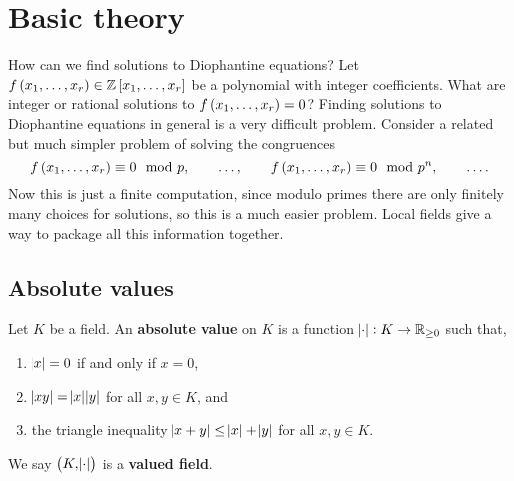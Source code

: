 \def\module{Local Fields}
\def\lecturer{Dr Rong Zhou}
\def\term{Michaelmas 2020}
\def\cover{}
\def\syllabus{}
\def\thm{subsection}







\setcounter{section}{0}

\section{Basic theory}


How can we find solutions to Diophantine equations? Let $ f\br{x_1, \dots, x_r} \in \ZZ\sbr{x_1, \dots, x_r} $ be a polynomial with integer coefficients. What are integer or rational solutions to $ f\br{x_1, \dots, x_r} = 0 $? Finding solutions to Diophantine equations in general is a very difficult problem. Consider a related but much simpler problem of solving the congruences
$$ f\br{x_1, \dots, x_r} \equiv 0 \mod p, \qquad \dots, \qquad f\br{x_1, \dots, x_r} \equiv 0 \mod p^n, \qquad \dots. $$
Now this is just a finite computation, since modulo primes there are only finitely many choices for solutions, so this is a much easier problem. Local fields give a way to package all this information together.

\subsection{Absolute values}

\begin{definition}
Let $ K $ be a field. An \textbf{absolute value} on $ K $ is a function $ \abs{\cdot} : K \to \mathbb{R}_{\ge 0} $ such that,
\begin{enumerate}
\item $ \abs{x} = 0 $ if and only if $ x = 0 $,
\item $ \abs{xy} = \abs{x}\abs{y} $ for all $ x, y \in K $, and
\item the triangle inequality $ \abs{x + y} \le \abs{x} + \abs{y} $ for all $ x, y \in K $.
\end{enumerate}
We say $ \br{K, \abs{\cdot}} $ is a \textbf{valued field}.
\end{definition}


